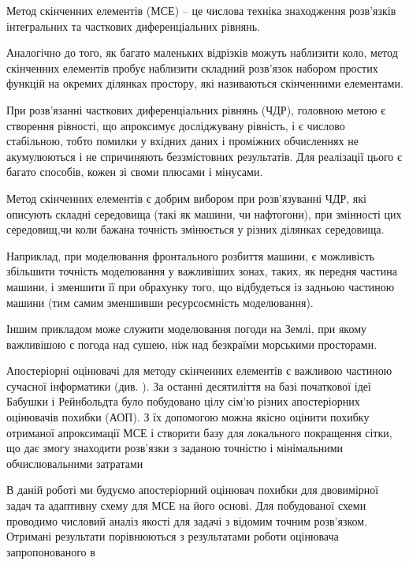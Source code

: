 

Метод скінченних елементів (МСЕ) -- це числова техніка знаходження розв'язків інтегральних та часткових диференціальних рівнянь.

Аналогічно до того, як багато маленьких відрізків можуть наблизити коло, метод скінченних елементів пробує наблизити складний розв'язок набором простих функцій на окремих ділянках простору, які називаються скінченними елементами.

При розв'язанні часткових диференціальних рівнянь (ЧДР), головною метою є створення рівності, що апроксимує досліджувану рівність, і є числово стабільною, тобто помилки у вхідних даних і проміжних обчисленнях не акумулюються і не спричиняють беззмістовних результатів. Для реалізації цього є багато способів, кожен зі своми плюсами і мінусами.

Метод скінченних елементів є добрим вибором при розв'язуванні ЧДР, які описують складні середовища (такі як машини, чи нафтогони), при змінності цих середовищ,чи коли бажана точність змінюється у різних ділянках середовища.

Наприклад, при моделювання фронтального розбиття машини, є можливість збільшити точність моделювання у важливіших зонах, таких, як передня частина машини, і зменшити її при обрахунку того, що відбудеться із задньою частиною машини (тим самим зменшивши ресурсоємність моделювання).

Іншим прикладом може служити моделювання погоди на Землі, при якому важливішою є погода над сушею, ніж над безкраїми морськими просторами.

Апостеріорні оцінювачі для методу скінченних елементів є важливою частиною сучасної інформатики (див. \cite{verfurth1996review, verfurth1994posteriori,eriksson1995introduction,ainsworth2011posteriori}). За останні десятиліття на базі початкової ідеї Бабушки і Рейнбольдта \cite{babuvska1978posteriori} було побудовано цілу сім'ю різних апостеріорних оцінювачів похибки (АОП). З їх допомогою можна якісно оцінити похибку отриманої апроксимації МСЕ і створити базу для локального покращення сітки, що дає змогу знаходити розв'язки з заданою точністю і мінімальними обчислювальними затратами \cite{babuska2011finite}

В даній роботі ми будуємо апостеріорний оцінювач похибки для двовимірної задач та адаптивну схему для МСЕ на його основі. Для побудованої схеми проводимо числовий аналіз якості для задачі з відомим точним розв'язком.
Отримані результати порівнюються з результатами роботи оцінювача запропонованого в \cite{OstShynAee11}



